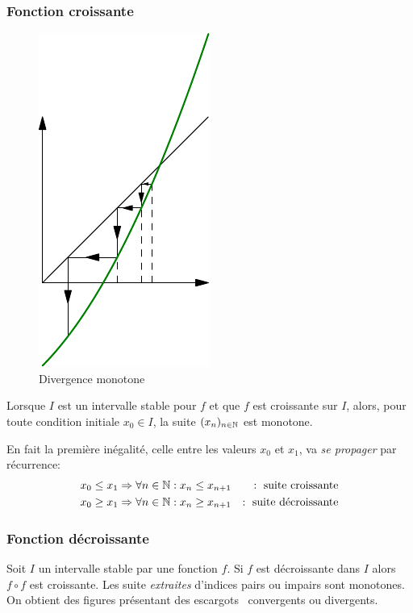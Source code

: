 \subsubsection{Fonction croissante}
\begin{figure}[h!t]
 \centering
 \includegraphics{C4792_1.pdf}
 \caption{Divergence monotone}
 \label{fig:C4792_1}
\end{figure}

\begin{prop}
 Lorsque $I$ est un intervalle stable pour $f$ et que $f$ est croissante sur $I$, alors, pour toute condition initiale $x_0\in I$, la suite $(x_n)_{n\in \mathbb{N}}$ est monotone.
\end{prop}
\begin{demo}
 En fait la première inégalité, celle entre les valeurs $x_0$ et $x_1$, va \emph{se propager} par récurrence:
\begin{align*}
 x_0\leq x_1 &\Rightarrow \forall n \in \mathbb{N} : x_n \leq x_{n+1} &:\text{ suite croissante}\\
x_0\geq x_1 &\Rightarrow \forall n \in \mathbb{N} : x_n \geq x_{n+1} &:\text{ suite décroissante}
\end{align*}
\end{demo}

\subsubsection{Fonction décroissante}
Soit $I$ un intervalle stable par une fonction $f$. Si $f$ est décroissante dans $I$ alors $f\circ f$ est croissante. Les suite \emph{extraites} d'indices pairs ou impairs sont monotones. On obtient des figures présentant des \og escargots\fg~ convergents ou divergents.

